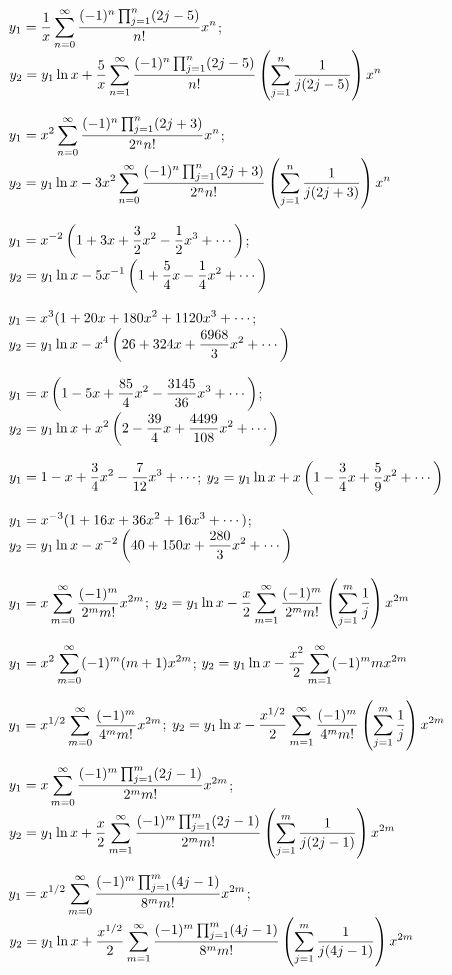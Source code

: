 $\displaystyle{y_1=\frac{1}{x}\sum_{n=0}^\infty\frac{(-1)^n\prod_{j=1}^n(2j-5)}{n!}x^n}$;
$\displaystyle{y_2=y_1\ln
x+\frac{5}{x}\sum_{n=1}^\infty\frac{(-1)^n\prod_{j=1}^n(2j-5)}{n!}
\left(\sum_{j=1}^n\frac{1}{j(2j-5)}\right)x^n}$

$\displaystyle{y_1=x^2\sum_{n=0}^\infty
\frac{(-1)^n\prod_{j=1}^n(2j+3)}{2^nn!}x^n}$;\;
$\displaystyle{y_2=y_1\ln x-3x^2\sum_{n=0}^\infty
\frac{(-1)^n\prod_{j=1}^n(2j+3)}{2^nn!}
\left(\sum_{j=1}^n\frac{1}{j(2j+ 3)}\right)x^n}$\;

$\displaystyle{y_1=x^{-2}\left(1+3x+\frac{3}{2}x^2-\frac{1}{2}x^3+\cdots\right)}$;\;
$\displaystyle{y_2=y_1\ln
x-5x^{-1}\left(1+\frac{5}{4}x-\frac{1}{4}x^2+\cdots\right)}$

$\displaystyle{y_1=x^3(1+20x+180x^2+1120x^3+\cdots}$;\;
$\displaystyle{y_2=y_1\ln
x-x^4\left(26+324x+\frac{6968}{3}x^2+\cdots\right)}$

$\displaystyle{y_1=x\left(1-5x+\frac{85}{4}x^2-\frac{3145}{36}x^3+\cdots\right)}$;\;
$\displaystyle{y_2=
y_1\ln
x+x^2\left(2-\frac{39}{4}x+\frac{4499}{108}x^2+\cdots\right)}$

$\displaystyle{y_1=1-x+\frac{3}{4}x^2-\frac{7}{12}x^3+\cdots}$;\;
$\displaystyle{y_2=y_1\ln
x+x\left(1-\frac{3}{4}x+\frac{5}{9}x^2+\cdots\right)}$

$\displaystyle{y_1=x^{-3}(1+16x+36x^2+16x^3+\cdots)}$;\;
$\displaystyle{y_2=y_1\ln
x-x^{-2}\left(40+150x+\frac{280}{3}x^2+\cdots\right)}$

$\displaystyle{y_1=x\sum_{m=0}^\infty\frac{(-1)^m}{2^mm!}x^{2m}}$;\;
$\displaystyle{y_2=y_1\ln x-\frac{x}{2}\sum_{m=1}^\infty\frac{(-1)^m}{2^mm!}\left(\sum_{j=1}^m\frac{1}{j}\right)x^{2m}}$

$\displaystyle{y_1=x^2\sum_{m=0}^\infty(-1)^m(m+1)x^{2m}}$;\;
$\displaystyle{y_2=y_1\ln x-\frac{x^2}{2}\sum_{m=1}^\infty(-1)^mmx^{2m}}$

$\displaystyle{y_1=x^{1/2}\sum_{m=0}^\infty\frac{(-1)^m}{4^mm!}x^{2m}}$;\;
$\displaystyle{y_2=y_1\ln x-\frac{x^{1/2}}{2}\sum_{m=1}^\infty\frac{(-1)^m}{4^mm!}\left(\sum_{j=1}^m\frac{1}{j}\right) x^{2m}}$

$\displaystyle{y_1=x\sum_{m=0}^\infty\frac{(-1)^m\prod_{j=1}^m(2j-1)}{2^mm!}
x^{2m}}$;\;
$\displaystyle{y_2=y_1\ln
x+\frac{x}{2}\sum_{m=1}^\infty\frac{(-1)^m\prod_{j=1}^m(2j-1)}{2^mm!}
\left(\sum_{j=1}^m\frac{1}{j(2j-1)}\right)x^{2m}}$

$\displaystyle{y_1=x^{1/2}\sum_{m=0}^\infty\frac{(-1)^m\prod_{j=1}^m(4j-1)}{8^mm!}
x^{2m}}$;\;
$\displaystyle{y_2=y_1\ln
x+\frac{x^{1/2}}{2}\sum_{m=1}^\infty\frac{(-1)^m\prod_{j=1}^m(4j-1)}{8^mm!}
\left(\sum_{j=1}^m\frac{1}{j(4j-1)}\right)x^{2m}}$

